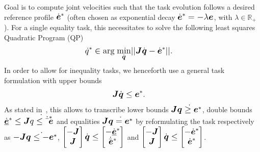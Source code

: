Goal is to compute joint velocities such that the task evolution follows a desired reference profile
$\dot{\mbm{e}}^*$ (often chosen as exponential decay $\dot{\mbm{e}}^*= -\lambda \mbm{e}$, with $\lambda
\in \mathbb{R}_+$). For a single equality task, this necessitates to solve the following least
squares Quadratic Program (QP)
%
\begin{align}\label{eq:QP}
  \dot{q}^* &\in \mbox{arg} \; \underset{\footnotesize\dot{\mbm{q}}\normalsize}{\mbox{min}}||\mbm{J}\dot{\mbm{q}}-\dot{\mbm{e}}^*||.
\end{align}
%
In order to allow for inequality tasks, we henceforth use a general task formulation with upper
bounds 
\begin{align}\label{eq:task}
  \mbm{J}\dot{\mbm{q}}&\leq \mbm{e}^*.
\end{align}
%
As stated in~\cite{Esca14}, this allows to transcribe lower bounds $\mbm{J}\dot{\mbm{q} \geq
  \mbm{e}^*}$, double bounds $\dot{\underline{\mbm{e}}}^* \leq \mbm{J}\dot{\mbm{q} \leq
  \dot{\bar{\mbm{e}}}^*}$ and equalities $\mbm{J}\dot{\mbm{q}=\mbm{e}^*}$ by reformulating the task
respectively as
$-\mbm{J}\dot{\mbm{q} \leq -\mbm{e}^*}$, $\begin{bmatrix} -\mbm{J} \\
  \mbm{J} \end{bmatrix}\dot{\mbm{q}} \leq \begin{bmatrix} -\dot{\underline{\mbm{e}}}^*
  \\ \dot{\bar{\mbm{e}}}^* \end{bmatrix}$ and $\begin{bmatrix} -\mbm{J} \\
  \mbm{J} \end{bmatrix}\dot{\mbm{q}} \leq \begin{bmatrix} -\dot{\mbm{e}}^* \\
  \dot{\mbm{e}}^* \end{bmatrix}$.

